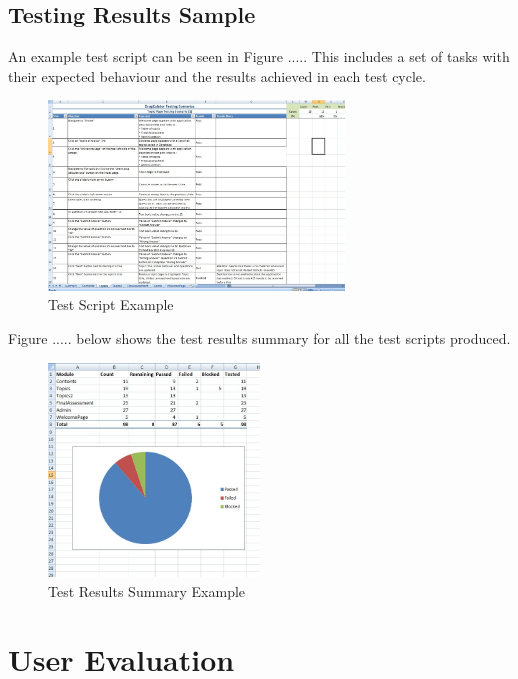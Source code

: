 \documentclass{l3proj}
\begin{document}
{%

\subsection{Testing Results Sample}

An example test script can be seen in Figure ..... This includes a set of tasks with their expected behaviour and the results achieved in each test cycle. 

\begin{figure}[!htb]
\caption{Test Script Example}
 \centering
\includegraphics[width=0.7\textwidth]{images/TopicTest.jpg}
\end{figure}


Figure ..... below shows the test results summary for all the test scripts produced. 

\begin{figure}[!htb]
\caption{Test Results Summary Example}
 \centering
\includegraphics[width=0.5\textwidth]{images/TestResultsSummary.jpg}
\end{figure}

\section{User Evaluation}

}
\end{document}
